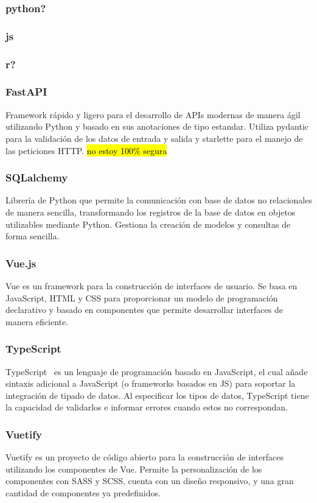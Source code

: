\subsubsection{python?}
\subsubsection{js}

\subsubsection{r?}

\subsubsection{FastAPI}
Framework rápido  y ligero para el desarrollo de APIs modernas de manera ágil utilizando Python y basado en sus anotaciones de tipo estandar.
Utiliza pydantic para la validación de los datos de entrada y salida y starlette para el manejo de las peticiones HTTP. \hl{no estoy 100\% segura}
\subsubsection{SQLalchemy}
Librería de Python que permite la comunicación con base de datos no relacionales de manera sencilla, transformando los registros de la base de datos en objetos utilizables mediante Python. Gestiona la creación de modelos y consultas de forma sencilla.
\subsubsection{Vue.js}
Vue es un framework para la construcción de interfaces de usuario. Se basa en JavaScript, HTML y CSS para proporcionar un modelo de programación declarativo y basado en componentes que permite desarrollar interfaces de manera eficiente.
\subsubsection{TypeScript}  
TypeScript~\cite{bierman2014understanding} es un lenguaje de programación basado en JavaScript, el cual añade sintaxis adicional a JavaScript (o frameworks basados en JS) para soportar la integración de tipado de datos. Al especificar los tipos de datos, TypeScript tiene la capacidad de validarlos e informar errores cuando estos no correspondan.
\subsubsection{Vuetify}
Vuetify es un proyecto de código abierto para la construcción de interfaces utilizando los componentes de Vue. Permite la personalización de los componentes con SASS y SCSS, cuenta con un diseño responsivo, y una gran cantidad de componentes ya predefinidos.
